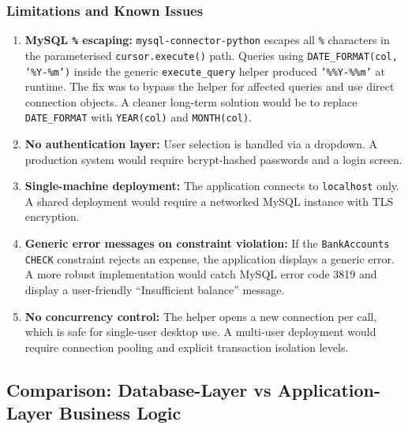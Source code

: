 \documentclass[12pt, a4paper]{article}
\begin{document}
\subsubsection{Limitations and Known Issues}

\begin{enumerate}[leftmargin=2em]
  \item \textbf{MySQL \texttt{\%} escaping:} \texttt{mysql-connector-python} escapes
        all \texttt{\%} characters in the parameterised \texttt{cursor.execute()} path.
        Queries using \texttt{DATE\_FORMAT(col, '\%Y-\%m')} inside the generic
        \texttt{execute\_query} helper produced \texttt{'\%\%Y-\%\%m'} at runtime.
        The fix was to bypass the helper for affected queries and use direct connection
        objects. A cleaner long-term solution would be to replace
        \texttt{DATE\_FORMAT} with \texttt{YEAR(col)} and \texttt{MONTH(col)}.

  \item \textbf{No authentication layer:} User selection is handled via a dropdown.
        A production system would require bcrypt-hashed passwords and a login screen.

  \item \textbf{Single-machine deployment:} The application connects to
        \texttt{localhost} only. A shared deployment would require a networked MySQL
        instance with TLS encryption.

  \item \textbf{Generic error messages on constraint violation:} If the
        \texttt{BankAccounts} \texttt{CHECK} constraint rejects an expense, the
        application displays a generic error. A more robust implementation would
        catch MySQL error code 3819 and display a user-friendly
        ``Insufficient balance'' message.

  \item \textbf{No concurrency control:} The helper opens a new connection per call,
        which is safe for single-user desktop use. A multi-user deployment would
        require connection pooling and explicit transaction isolation levels.
\end{enumerate}

\subsection{Comparison: Database-Layer vs Application-Layer Business Logic}
\end{document}
